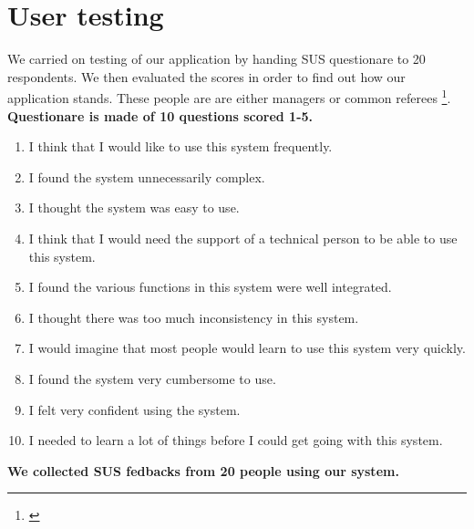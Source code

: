 \section{User testing}
We carried on testing of our application by handing SUS questionare to 20 respondents. We then evaluated the scores in order to find out how our application stands. These people are are either managers or common referees \footnote{\cite{SUSDesc}}. 
\newline
\textbf{Questionare is made of 10 questions scored 1-5.}
\begin{enumerate}
    \item I think that I would like to use this system frequently.
    \item I found the system unnecessarily complex.
    \item I thought the system was easy to use.
    \item I think that I would need the support of a technical person to be able to use this system.
    \item I found the various functions in this system were well integrated.
    \item I thought there was too much inconsistency in this system.
    \item I would imagine that most people would learn to use this system very quickly.
    \item I found the system very cumbersome to use.
    \item I felt very confident using the system.
    \item I needed to learn a lot of things before I could get going with this system.
\end{enumerate}
\textbf{We collected SUS fedbacks from 20 people using our system.}
\newline
